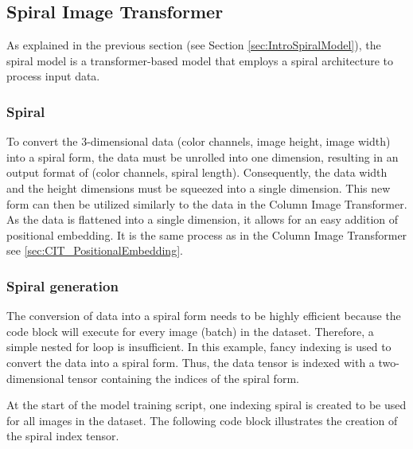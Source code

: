 \subsection{Spiral Image Transformer}

    As explained in the previous section (see Section \ref{sec:IntroSpiralModel}), the spiral model is a transformer-based model that employs a spiral architecture to process input data. 

    \subsubsection{Spiral}

    To convert the 3-dimensional data (color channels, image height, image width) into a spiral form, the data must be unrolled into one dimension, resulting in an output format of (color channels, spiral length). Consequently, the data width and the height dimensions must be squeezed into a single dimension. This new form can then be utilized similarly to the data in the Column Image Transformer. As the data is flattened into a single dimension, it allows for an easy addition of positional embedding. It is the same process as in the Column Image Transformer see \autoref{sec:CIT_PositionalEmbedding}.

    \subsubsection{Spiral generation}
    \label{sec:spiral_generation}
    The conversion of data into a spiral form needs to be highly efficient because the code block will execute for every image (batch) in the dataset. Therefore, a simple nested for loop is insufficient. In this example, fancy indexing is used to convert the data into a spiral form. Thus, the data tensor is indexed with a two-dimensional tensor containing the indices of the spiral form.

    At the start of the model training script, one indexing spiral is created to be used for all images in the dataset. The following code block illustrates the creation of the spiral index tensor.

